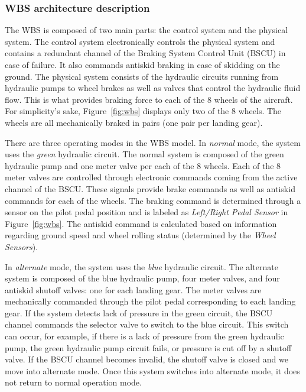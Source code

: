 \subsubsection{WBS architecture description}
The WBS is composed of two main parts: the control system and the physical system. The control system electronically controls the physical system and contains a redundant channel of the Braking System Control Unit (BSCU) in case of failure. It also commands antiskid braking in case of skidding on the ground. The physical system consists of the hydraulic circuits running from hydraulic pumps to wheel brakes as well as valves that control the hydraulic fluid flow. This is what provides braking force to each of the 8 wheels of the aircraft. For simplicity's sake, Figure~\ref{fig:wbs} displays only two of the 8 wheels. The wheels are all mechanically braked in pairs (one pair per landing gear). 

There are three operating modes in the WBS model. In \textit{normal} mode, the system uses the \textit{green} hydraulic circuit. The normal system is composed of the green hydraulic pump and one meter valve per each of the 8 wheels. Each of the 8 meter valves are controlled through electronic commands coming from the active channel of the BSCU. These signals provide brake commands as well as antiskid commands for each of the wheels. The braking command is determined through a sensor on the pilot pedal position and is labeled as \textit{Left/Right Pedal Sensor} in Figure~\ref{fig:wbs}. The antiskid command is calculated based on information regarding ground speed and wheel rolling status (determined by the \textit{Wheel Sensors}). 

In \textit{alternate} mode, the system uses the \textit{blue} hydraulic circuit. The alternate system is composed of the blue hydraulic pump, four meter valves, and four antiskid shutoff valves: one for each landing gear. The meter valves are mechanically commanded through the pilot pedal corresponding to each landing gear. If the system detects lack of pressure in the green circuit, the BSCU channel commands the selector valve to switch to the blue circuit. This switch can occur, for example, if there is a lack of pressure from the green hydraulic pump, the green hydraulic pump circuit fails, or pressure is cut off by a shutoff valve. If the BSCU channel becomes invalid, the shutoff valve is closed and we move into alternate mode. Once this system switches into alternate mode, it does not return to normal operation mode.

